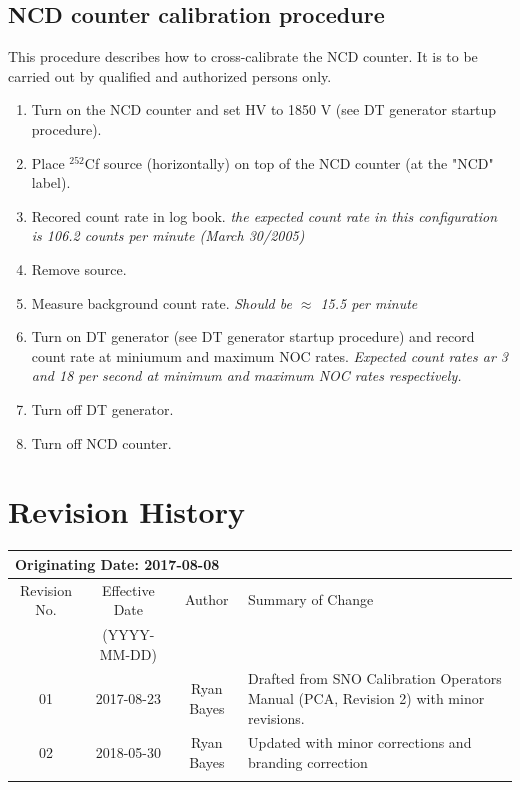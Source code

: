\subsection{ NCD counter calibration procedure}

This procedure describes how to cross-calibrate the NCD counter. It is to be carried out by qualified and authorized persons only.
\begin{enumerate}
\item \CheckBox[name=ncdcc1]{} Turn on the NCD counter and set HV to 1850 V (see DT generator startup procedure).
\item \CheckBox[name=ncdcc2]{} Place $^{252}$Cf source (horizontally) on top of the NCD counter (at the "NCD" label).
\item \CheckBox[name=ncdcc3]{} Recored count rate in log book. {\it the expected count rate in this configuration is 106.2 counts per minute (March 30/2005)}
\item \CheckBox[name=ncdcc4]{} Remove source.
\item \CheckBox[name=ncdcc5]{} Measure background count rate.  {\it Should be $\approx$ 15.5 per minute}
\item \CheckBox[name=ncdcc6]{} Turn on DT generator (see DT generator startup procedure) and record count rate at miniumum and maximum NOC rates. {\it Expected count rates ar 3 and 18 per second at minimum and maximum NOC rates respectively.}
\item \CheckBox[name=ncdcc7]{} Turn off DT generator.
\item \CheckBox[name=ncdcc8]{} Turn off NCD counter.
\end{enumerate}

\section{Revision History}
\begin{tabular}{|c|c|c|p{6cm}|}
\hline\hline
\multicolumn{4}{|l|}{Originating Date: 2017-08-08}\\
\hline
Revision No. & Effective Date & Author & Summary of Change \\
& (YYYY-MM-DD) & & \\
\hline
01 & 2017-08-23 & Ryan Bayes & Drafted from SNO Calibration Operators Manual (PCA, Revision 2) with minor revisions.\\
\hline
02 & 2018-05-30 & Ryan Bayes & Updated with minor corrections and
branding correction\\
\hline
& & & \\
\hline \hline

\end{tabular}

